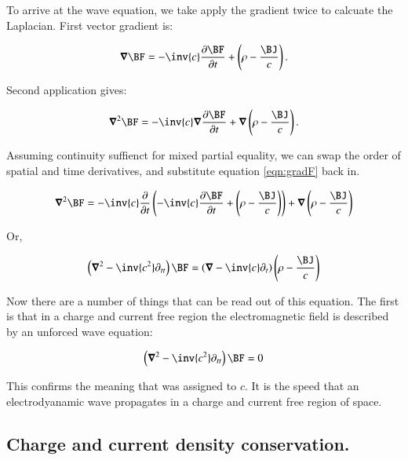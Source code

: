 \documentclass{article}
\newcommand{\spacegrad}[0]{\boldsymbol{\nabla}}
\begin{document}
To arrive at the wave equation, we take apply the gradient twice to calcuate the Laplacian.  First vector gradient is:

\begin{equation}\label{eqn:gradF}
\spacegrad \BF = -\inv{c}\frac{\partial \BF}{\partial t} + \left(\rho - \frac{\BJ}{c}\right).
\end{equation}

Second application gives:

\begin{equation*}
\spacegrad^2 \BF = -\inv{c}\spacegrad\frac{\partial \BF}{\partial t} + \spacegrad \left(\rho - \frac{\BJ}{c}\right).
\end{equation*}

Assuming continuity suffienct for mixed partial equality, we can swap the order of spatial and time derivatives, and
substitute equation \ref{eqn:gradF} back in.

\begin{align*}
\spacegrad^2 \BF 
&= -\inv{c}\frac{\partial}{\partial t}\left( -\inv{c}\frac{\partial \BF}{\partial t} + \left(\rho - \frac{\BJ}{c}\right) \right) + \spacegrad \left(\rho - \frac{\BJ}{c}\right) \\
\end{align*}

Or,

\begin{equation} \label{eqn:wave}
\left(\spacegrad^2 - \inv{c^2}\partial_{tt} \right)\BF = \left(\spacegrad - \inv{c}\partial_{t} \right) \left(\rho - \frac{\BJ}{c}\right) 
\end{equation}

Now there are a number of things that can be read out of this equation.  The first is that in a charge and current free region the electromagnetic field is described by an unforced wave equation:

\begin{equation}
\left(\spacegrad^2 - \inv{c^2}\partial_{tt} \right)\BF = 0
\end{equation}

This confirms the meaning that was assigned to $c$.
It is the speed that an electrodyanamic wave propagates in a charge and current free region of space.

\subsection{ Charge and current density conservation. }
\end{document}
